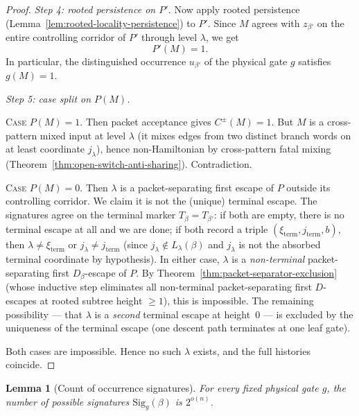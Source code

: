 \documentclass[11pt]{article}
\newtheorem{lemma}[theorem]{Lemma}
\begin{document}
\begin{proof}
\emph{Step 4: rooted persistence on $P'$.}
Now apply rooted persistence
(Lemma~\ref{lem:rooted-locality-persistence}) to $P'$.  Since $M$
agrees with $z_{\beta'}$ on the entire controlling corridor of $P'$
through level $\lambda$, we get
\[
P'(M) = 1.
\]
In particular, the distinguished occurrence $u_{\beta'}$ of the physical
gate $g$ satisfies $g(M) = 1$.

\emph{Step 5: case split on $P(M)$.}

\textsc{Case $P(M) = 1$.}
Then packet acceptance gives $C^{\pm}(M) = 1$.  But $M$ is a
cross-pattern mixed input at level $\lambda$ (it mixes edges from two
distinct branch words on at least coordinate $j_\lambda$), hence
non-Hamiltonian by cross-pattern fatal mixing
(Theorem~\ref{thm:open-switch-anti-sharing}).  Contradiction.

\textsc{Case $P(M) = 0$.}
Then $\lambda$ is a packet-separating first escape of $P$ outside its
controlling corridor.  We claim it is not the (unique) terminal escape.
The signatures agree on the terminal marker $T_\beta = T_{\beta'}$: if
both are empty, there is no terminal escape at all and we are done; if
both record a triple $(\xi_{\mathrm{term}}, j_{\mathrm{term}}, b)$,
then $\lambda \neq \xi_{\mathrm{term}}$ or $j_\lambda \neq
j_{\mathrm{term}}$ (since $j_\lambda \notin L_\lambda(\beta)$ and
$j_\lambda$ is not the absorbed terminal coordinate by hypothesis).
In either case, $\lambda$ is a \emph{non-terminal} packet-separating
first $D_\beta$-escape of $P$.  By
Theorem~\ref{thm:packet-separator-exclusion} (whose inductive step
eliminates all non-terminal packet-separating first $D$-escapes at
rooted subtree height $\ge 1$), this is impossible.  The remaining
possibility --- that $\lambda$ is a \emph{second} terminal escape at
height~$0$ --- is excluded by the uniqueness of the terminal escape
(one descent path terminates at one leaf gate).

Both cases are impossible.  Hence no such $\lambda$ exists, and the full
histories coincide.
\end{proof}

\begin{lemma}[Count of occurrence signatures]
\label{lem:signature-count}
For every fixed physical gate $g$, the number of possible signatures
$\mathrm{Sig}_g(\beta)$ is $2^{o(n)}$.
\end{lemma}
\end{document}
